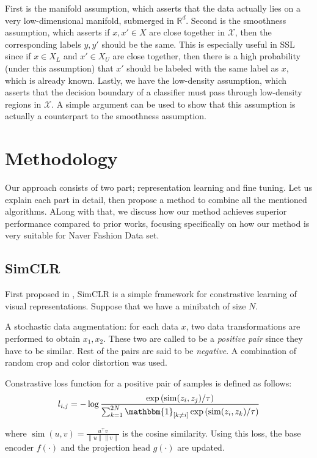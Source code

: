 \documentclass[10pt,twocolumn,letterpaper]{article}
\DeclareMathOperator{\similar}{\mathrm{sim}}
\begin{document}
	First is the manifold assumption, which asserts that the data actually lies on a very low-dimensional manifold, submerged in $\mathbb{R}^d$.
	Second is the smoothness assumption, which asserts if $x, x' \in X$ are close together in $\mathcal{X}$, then the corresponding labels $y, y'$ should be the same.
	This is especially useful in SSL since if $x \in X_L$ and $x' \in X_U$ are close together, then there is a high probability (under this assumption) that $x'$ should be labeled with the same label as $x$, which is already known.
	Lastly, we have the low-density assumption, which asserts that the decision boundary of a classifier must pass through low-density regions in $\mathcal{X}$.
	A simple argument\cite{EH20} can be used to show that this assumption is actually a counterpart to the smoothness assumption.
	
	
	\section{Methodology}
	Our approach consists of two part; representation learning and fine tuning.
	Let us explain each part in detail, then propose a method to combine all the mentioned algorithms.
	ALong with that, we discuss how our method achieves superior performance compared to prior works, focusing specifically on how our method is very suitable for Naver Fashion Data set.
	
	
	\subsection{SimCLR}
	First proposed in \cite{CKNH20}, SimCLR is a simple framework for constrastive learning of visual representations.
	Suppose that we have a minibatch of size $N$.
	
	A stochastic data augmentation: for each data $x$, two data transformations are performed to obtain $x_1, x_2$.
	These two are called to be a {\it positive pair} since they have to be similar.
	Rest of the pairs are said to be {\it negative}.
	A combination of random crop and color distortion was used.
	
	Constrastive loss function for a positive pair of samples is defined as follows:
	\[ l_{i,j} = -\log \frac{\exp\left(\similar(z_i, z_j) / \tau\right)}{\sum_{k=1}^{2N} \mathbbm{1}_{[k \not= i]} \exp\left( \similar(z_i, z_k) / \tau \right)} \]
	
	where $\similar(u, v) = \frac{u^\intercal v}{\lVert u \rVert \lVert v \rVert}$ is the cosine similarity.
	Using this loss, the base encoder $f(\cdot)$ and the projection head $g(\cdot)$ are updated.
	
\end{document}
